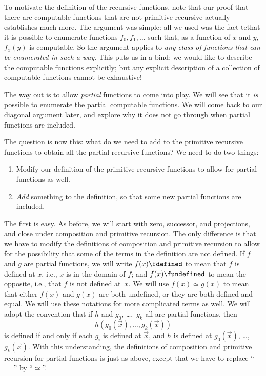 \documentclass[../../../include/open-logic-section]{subfiles}
\begin{document}


To motivate the definition of the recursive functions, note that our
proof that there are computable functions that are not primitive
recursive actually establishes much more. The argument was
simple: all we used was the fact tethat it is possible to enumerate
functions $f_0,f_1,\dots$ such that, as a function of $x$ and $y$,
$f_x(y)$ is computable. So the argument applies to \emph{any class of
  functions that can be enumerated in such a way}. This puts us in a
bind: we would like to describe the computable functions explicitly;
but any explicit description of a collection of computable functions
cannot be exhaustive!

The way out is to allow \emph{partial} functions to come into play. We
will see that it \emph{is} possible to enumerate the partial
computable functions. We will come back to our diagonal
argument later, and explore why it does not go through when partial
functions are included.

The question is now this: what do we need to add to the primitive
recursive functions to obtain all the partial recursive functions? We
need to do two things:
\begin{enumerate}
\item Modify our definition of the primitive recursive functions to
  allow for partial functions as well.
\item \emph{Add} something to the definition, so that some new partial
  functions are included.
\end{enumerate}

The first is easy. As before, we will start with zero, successor, and
projections, and close under composition and primitive recursion. The
only difference is that we have to modify the definitions of
composition and primitive recursion to allow for the possibility that
some of the terms in the definition are not defined. If $f$ and $g$
are partial functions, we will write $f(x) \fdefined$ to mean that $f$
is defined at $x$, i.e., $x$ is in the domain of $f$; and $f(x)
\fundefined$ to mean the opposite, i.e., that $f$ is not defined at~$x$.
We will use $f(x) \simeq g(x)$ to mean that either $f(x)$ and $g(x)$
are both undefined, or they are both defined and equal. We will use these
notations for more complicated terms as well. We will adopt the
convention that if $h$ and $g_0$, \dots,~$g_k$ all are partial functions,
then
\[
h(g_0(\vec x),\dots,g_k(\vec x))
\]
is defined if and only if each $g_i$ is defined at $\vec x$, and $h$
is defined at $g_0(\vec x)$, \dots,~$g_k(\vec x)$. With this
understanding, the definitions of composition and primitive recursion
for partial functions is just as above, except that we have to replace
``$=$'' by ``$\simeq$''.
\end{document}
